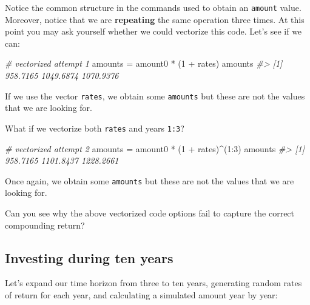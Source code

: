 \documentclass[
]{book}
\newenvironment{Shaded}{\begin{snugshade}}{\end{snugshade}}
\newcommand{\CommentTok}[1]{\textcolor[rgb]{0.56,0.35,0.01}{\textit{#1}}}
\newcommand{\DecValTok}[1]{\textcolor[rgb]{0.00,0.00,0.81}{#1}}
\newcommand{\NormalTok}[1]{#1}
\newcommand{\OtherTok}[1]{\textcolor[rgb]{0.56,0.35,0.01}{#1}}
\newcommand{\SpecialCharTok}[1]{\textcolor[rgb]{0.00,0.00,0.00}{#1}}
\begin{document}
Notice the common structure in the commands used to obtain an \texttt{amount} value.
Moreover, notice that we are \textbf{repeating} the same operation three times.
At this point you may ask yourself whether we could vectorize this code. Let's
see if we can:

\begin{Shaded}
\begin{Highlighting}[]
\CommentTok{\# vectorized attempt 1}
\NormalTok{amounts }\OtherTok{=}\NormalTok{ amount0 }\SpecialCharTok{*}\NormalTok{ (}\DecValTok{1} \SpecialCharTok{+}\NormalTok{ rates)}
\NormalTok{amounts}
\CommentTok{\#\textgreater{} [1]  958.7165 1049.6874 1070.9376}
\end{Highlighting}
\end{Shaded}

If we use the vector \texttt{rates}, we obtain some \texttt{amounts} but these are not the
values that we are looking for.

What if we vectorize both \texttt{rates} and years \texttt{1:3}?

\begin{Shaded}
\begin{Highlighting}[]
\CommentTok{\# vectorized attempt 2}
\NormalTok{amounts }\OtherTok{=}\NormalTok{ amount0 }\SpecialCharTok{*}\NormalTok{ (}\DecValTok{1} \SpecialCharTok{+}\NormalTok{ rates)}\SpecialCharTok{\^{}}\NormalTok{(}\DecValTok{1}\SpecialCharTok{:}\DecValTok{3}\NormalTok{)}
\NormalTok{amounts}
\CommentTok{\#\textgreater{} [1]  958.7165 1101.8437 1228.2661}
\end{Highlighting}
\end{Shaded}

Once again, we obtain some \texttt{amounts} but these are not the values that we are
looking for.

Can you see why the above vectorized code options fail to capture the correct
compounding return?

\hypertarget{investing-during-ten-years}{%
\subsection{Investing during ten years}\label{investing-during-ten-years}}

Let's expand our time horizon from three to ten years, generating random
rates of return for each year, and calculating a simulated amount year by
year:
\end{document}
